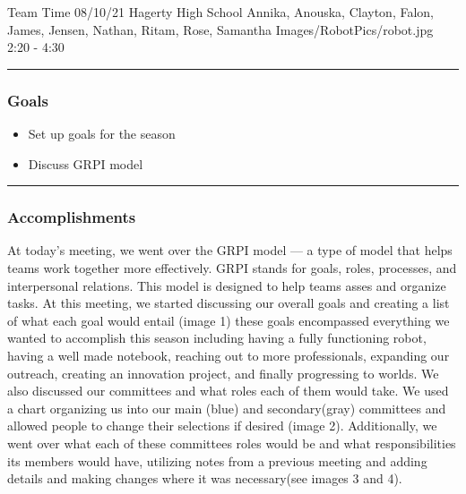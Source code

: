\insertmeeting 
	{Team Time} 
	{08/10/21}
	{Hagerty High School}
	{Annika, Anouska, Clayton, Falon, James, Jensen, Nathan, Ritam, Rose, Samantha}
	{Images/RobotPics/robot.jpg}
	{2:20 - 4:30}
	
\noindent\hfil\rule{\textwidth}{.4pt}\hfil
\subsubsection*{Goals}
\begin{itemize}
    \item Set up goals for the season
	\item Discuss GRPI model

\end{itemize} 

\noindent\hfil\rule{\textwidth}{.4pt}\hfil

\subsubsection*{Accomplishments}
At today's meeting, we went over the GRPI model --- a type of model that helps teams work together more effectively. GRPI stands for goals, roles, processes, and interpersonal relations. This model is designed to help teams asses and organize tasks. At this meeting, we started discussing our overall goals and creating a list of what each goal would entail (image 1) these goals encompassed everything we wanted to accomplish this season including having a fully functioning robot, having a well made notebook, reaching out to more professionals, expanding our outreach, creating an innovation project, and finally progressing to worlds. 
We also discussed our committees and what roles each of them would take. We used a chart organizing us into our main (blue) and secondary(gray) committees and allowed people to change their selections if desired (image 2). Additionally, we went over what each of these committees roles would be and what responsibilities its members would have, utilizing notes from a previous meeting and adding details and making changes where it was necessary(see images 3 and 4).

